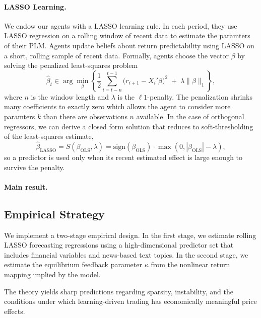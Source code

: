 \documentclass[11pt]{article}
\begin{document}
\paragraph{LASSO Learning.}
We endow our agents with a LASSO learning rule.
In each period, they use LASSO regression on a rolling window of recent data to estimate the paramters of their PLM.
Agents update beliefs about return predictability using LASSO on a short, rolling sample of recent data.
Formally, agents choose the vector $\beta$ by solving the penalized least-squares problem
\begin{equation}
\hat\beta_t \in \arg\min_{\beta}\left\{\frac{1}{2}\sum_{i=t-n}^{t-1}\big(r_{i+1}-X_i'\beta\big)^2
\;+\;\lambda \|\beta\|_1\right\},
\end{equation}
where $n$ is the window length and $\lambda$ is the $\ell 1$-penalty. 
The penalization shrinks many coefficients to exactly zero which allows the agent to consider more paramters $k$ than there are observations $n$ available.
In the case of orthogonal regressors, we can derive a closed form solution that reduces to soft-thresholding of the least-squares estimate,
\begin{equation}\label{eq:lasso_from_ols}
\hat{\beta}_{\text{LASSO}} = S(\beta_{\text{OLS}}, \lambda) = \textrm{sign}(\beta_{\text{OLS}}) \cdot \max\left(0, |\beta_{\text{OLS}}| - \lambda\right),
\end{equation}
so a predictor is used only when its recent estimated effect is large enough to survive the penalty.

\paragraph{Main result.}








\subsection*{Empirical Strategy}

We implement a two-stage empirical design.
In the first stage, we estimate rolling LASSO forecasting regressions using a high-dimensional predictor set that includes financial variables and news-based text topics.
In the second stage, we estimate the equilibrium feedback parameter $\kappa$ from the nonlinear return mapping implied by the model.

The theory yields sharp predictions regarding sparsity, instability, and the conditions under which learning-driven trading has economically meaningful price effects.
\end{document}
